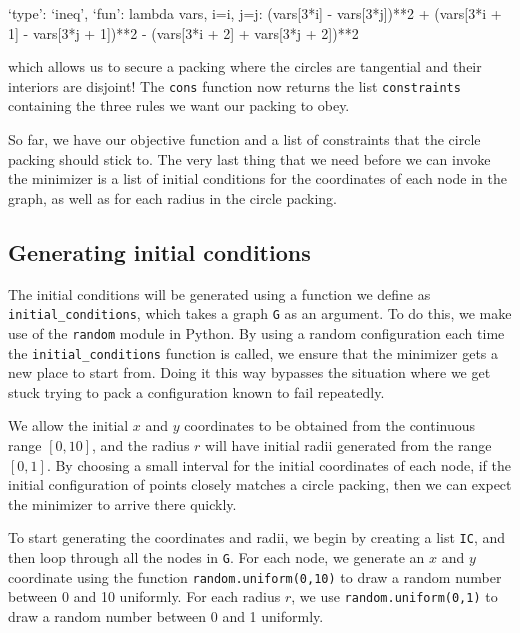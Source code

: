 \begin{code}
    {`type': `ineq', `fun': lambda vars, i=i, j=j: 
    (vars[3*i] - vars[3*j])**2 + (vars[3*i + 1] - vars[3*j + 1])**2 - 
    (vars[3*i + 2] + vars[3*j + 2])**2}
\end{code}

\begin{flushleft}
which allows us to secure a packing where the circles are tangential and their interiors are disjoint! The \texttt{cons} function now returns the list \texttt{constraints} containing the three rules we want our packing to obey. 
\end{flushleft}

\begin{flushleft}
So far, we have our objective function and a list of constraints that the circle packing should stick to. The very last thing that we need before we can invoke the minimizer is a list of initial conditions for the coordinates of each node in the graph, as well as for each radius in the circle packing.
\end{flushleft}

\subsection{Generating initial conditions}

\begin{flushleft}
The initial conditions will be generated using a function we define as \texttt{initial\_conditions}, which takes a graph \texttt{G} as an argument. To do this, we make use of the \texttt{random} \cite{random} module in Python. By using a random configuration each time the \texttt{initial\_conditions} function is called, we ensure that the minimizer gets a new place to start from. Doing it this way bypasses the situation where we get stuck trying to pack a configuration known to fail repeatedly.
\end{flushleft}

\begin{flushleft}
We allow the initial $x$ and $y$ coordinates to be obtained from the continuous range $[0,10]$, and the radius $r$ will have initial radii generated from the range $[0,1]$. By choosing a small interval for the initial coordinates of each node, if the initial configuration of points closely matches a circle packing, then we can expect the minimizer to arrive there quickly.
\end{flushleft}

\begin{flushleft}
To start generating the coordinates and radii, we begin by creating a list \texttt{IC}, and then loop through all the nodes in \texttt{G}. For each node, we generate an $x$ and $y$ coordinate using the function \texttt{random.uniform(0,10)} to draw a random number between 0 and 10 uniformly. For each radius $r$, we use \texttt{random.uniform(0,1)} to draw a random number between 0 and 1 uniformly.
\end{flushleft}

